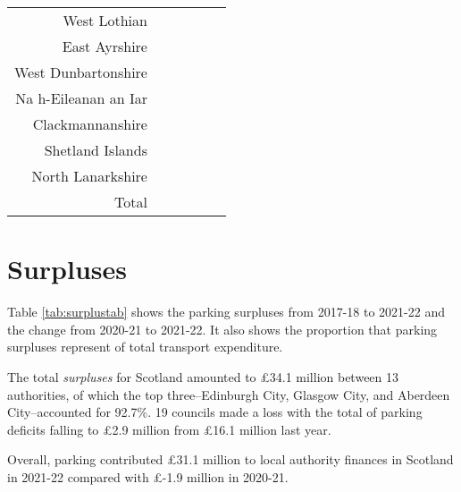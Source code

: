 \documentclass[
  12pt,
]{article}
\begin{document}
\begin{longtable}[t]{rrrrrr}
West Lothian & \cellcolor{white}{} & \cellcolor{white}{} & \cellcolor{white}{} & \cellcolor{white}{} & \cellcolor{white}{}\\
East Ayrshire & \cellcolor{white}{  81.5\%} & \cellcolor{white}{  71.9\%} & \cellcolor{white}{  73.5\%} & \cellcolor{white}{ 110.3\%} & \cellcolor{white}{  18.5\%}\\
West Dunbartonshire & \cellcolor{white}{} & \cellcolor{white}{} & \cellcolor{white}{} & \cellcolor{white}{} & \cellcolor{white}{}\\
Na h-Eileanan an Iar & \cellcolor{white}{ 276.6\%} & \cellcolor{white}{ 155.4\%} & \cellcolor{white}{ 166.2\%} & \cellcolor{white}{ 575.0\%} & \cellcolor{white}{ 293.9\%}\\
Clackmannanshire & \cellcolor{white}{} & \cellcolor{white}{ 130.3\%} & \cellcolor{white}{ 147.4\%} & \cellcolor{white}{ 216.7\%} & \cellcolor{white}{ 200.0\%}\\
Shetland Islands & \cellcolor{white}{  85.7\%} & \cellcolor{white}{ 253.8\%} & \cellcolor{white}{ 106.6\%} & \cellcolor{white}{ 192.3\%} & \cellcolor{white}{ 260.0\%}\\
North Lanarkshire & \cellcolor{white}{} & \cellcolor{white}{} & \cellcolor{white}{} & \cellcolor{white}{} & \cellcolor{white}{}\\
\midrule
Total & \cellcolor{white}{  49.5\%} & \cellcolor{white}{  47.0\%} & \cellcolor{white}{  46.9\%} & \cellcolor{white}{ 104.5\%} & \cellcolor{white}{  60.4\%}\\*
\end{longtable}
\endgroup{}

\newpage

\hypertarget{surpluses}{%
\section{Surpluses}\label{surpluses}}

Table \ref{tab:surplustab} shows the parking surpluses from 2017-18 to 2021-22 and the change from 2020-21 to 2021-22. It also shows the proportion that parking surpluses represent of total transport expenditure.

The total \emph{surpluses} for Scotland amounted to £34.1 million between 13 authorities, of which the top three--Edinburgh City, Glasgow City, and Aberdeen City--accounted for 92.7\%. 19 councils made a loss with the total of parking deficits falling to £2.9 million from £16.1 million last year.

Overall, parking contributed £31.1 million to local authority finances in Scotland in 2021-22 compared with £-1.9 million in 2020-21.
\end{document}
